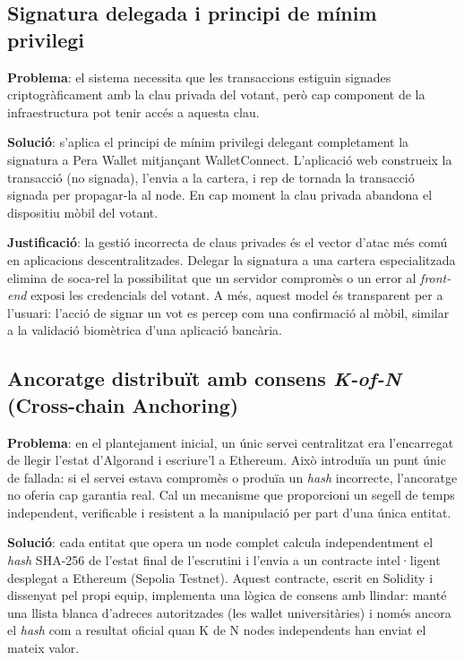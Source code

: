 \subsection{Signatura delegada i principi de mínim privilegi}
 
\textbf{Problema}: el sistema necessita que les transaccions estiguin signades criptogràficament amb la clau privada del votant, però cap component de la infraestructura pot tenir accés a aquesta clau.
 
\textbf{Solució}: s'aplica el principi de mínim privilegi delegant completament la signatura a Pera Wallet mitjançant WalletConnect. L'aplicació web construeix la transacció (no signada), l'envia a la cartera, i rep de tornada la transacció signada per propagar-la al node. En cap moment la clau privada abandona el dispositiu mòbil del votant.
 
\textbf{Justificació}: la gestió incorrecta de claus privades és el vector d'atac més comú en aplicacions descentralitzades. Delegar la signatura a una cartera especialitzada elimina de soca-rel la possibilitat que un servidor compromès o un error al \textit{front-end} exposi les credencials del votant. A més, aquest model és transparent per a l'usuari: l'acció de signar un vot es percep com una confirmació al mòbil, similar a la validació biomètrica d'una aplicació bancària.
 
\subsection{Ancoratge distribuït amb consens \textit{K-of-N} (Cross-chain Anchoring)}
 
\textbf{Problema}: en el plantejament inicial, un únic servei centralitzat era l'encarregat de llegir l'estat d'Algorand i escriure'l a Ethereum. Això introduïa un punt únic de fallada: si el servei estava compromès o produïa un \textit{hash} incorrecte, l'ancoratge no oferia cap garantia real. Cal un mecanisme que proporcioni un segell de temps independent, verificable i resistent a la manipulació per part d'una única entitat.
 
\textbf{Solució}: cada entitat que opera un node complet calcula independentment el \textit{hash} SHA-256 de l'estat final de l'escrutini i l'envia a un contracte intel·ligent desplegat a Ethereum (Sepolia Testnet). Aquest contracte, escrit en Solidity i dissenyat pel propi equip, implementa una lògica de consens amb llindar: manté una llista blanca d'adreces autoritzades (les wallet universitàries) i només ancora el \textit{hash} com a resultat oficial quan K de N nodes independents han enviat el mateix valor.
 
